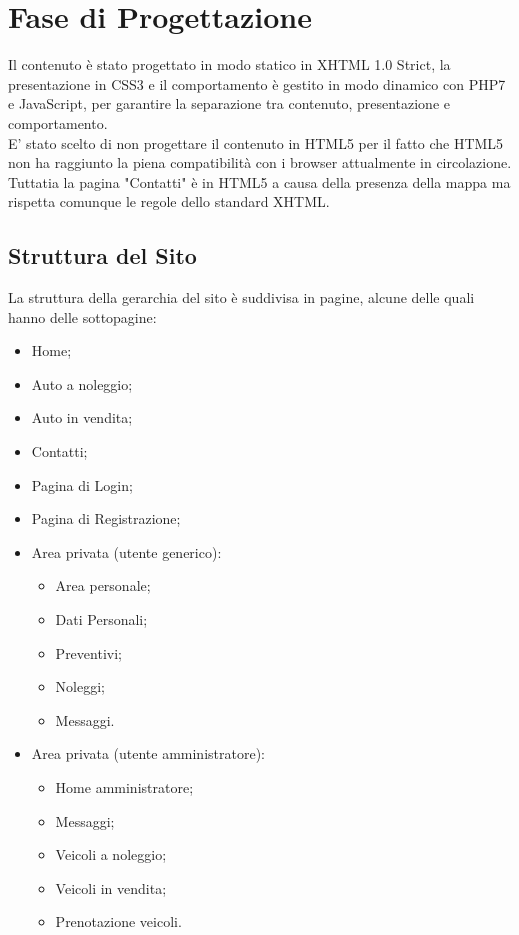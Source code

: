 \section{Fase di Progettazione}
    Il contenuto è stato progettato in modo statico in XHTML 1.0 Strict, la presentazione in CSS3 e il comportamento è gestito in modo dinamico con PHP7 e JavaScript, per garantire la separazione tra contenuto, presentazione e comportamento. \\
    E’ stato scelto di non progettare il contenuto in HTML5 per il fatto che HTML5 non ha raggiunto la piena compatibilità con i browser attualmente in circolazione. Tuttatia la pagina "Contatti" è in HTML5 a causa della presenza della mappa ma rispetta comunque le regole dello standard XHTML.
    \subsection{Struttura del Sito}
        
    La struttura della gerarchia del sito è suddivisa in pagine, alcune delle quali hanno delle sottopagine:
    \begin{itemize}
        \item Home;
        \item Auto a noleggio;
        \item Auto in vendita;
        \item Contatti;
        \item Pagina di Login;
        \item Pagina di Registrazione;
        \item Area privata (utente generico):
            \begin{itemize}
                \item Area personale;
                \item Dati Personali;
                \item Preventivi;
                \item Noleggi;
                \item Messaggi.
            \end{itemize}
        \item Area privata (utente amministratore):
            \begin{itemize}
            	\item Home amministratore;
                 \item Messaggi;
                 \item Veicoli a noleggio;
                 \item Veicoli in vendita;
                 \item Prenotazione veicoli.
            \end{itemize}
    \end{itemize}

